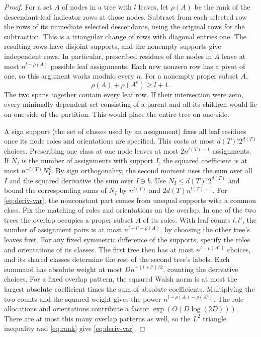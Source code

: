 \documentclass[11pt,letterpaper]{article}
\begin{document}
\begin{proof}
For a set \(A\) of nodes in a tree with \(l\) leaves, let \(\rho(A)\)
be the rank of the descendant-leaf indicator rows at those nodes.
Subtract from each selected row the rows of its immediate selected
descendants, using the original rows for the subtraction. This is
a triangular change of rows with diagonal entries one. The resulting
rows have disjoint supports, and the nonempty supports give
independent rows. In particular, prescribed
residues of the nodes in \(A\) leave at most \(n^{l-\rho(A)}\) possible
leaf assignments. Each new nonzero row has a pivot of one, so this
argument works modulo every \(n\). For a nonempty proper subset \(A\),
\begin{equation}\label{eq:rank}
 \rho(A)+\rho(A^{\mathrm c})\ge l+1.
\end{equation}
The two spans together contain every leaf row. If their intersection
were zero, every minimally dependent set consisting of a parent and
all its children would lie on one side of the partition. This would
place the entire tree on one side.

A sign support (the set of classes used by an assignment) fixes all
leaf residues once its node roles and orientations are specified.
This costs at most \(d(T)!2^{d(T)}\) choices. Prescribing one class at
one node leaves at most \(2n^{l(T)-1}\) assignments. If \(N_I\) is the
number of assignments with support \(I\), the squared coefficient is
at most \(n^{-l(T)}N_I^2\). By sign orthogonality, the second moment
uses the sum over all \(I\) and the squared derivative the sum over
\(I\ni b\). Use \(N_I\le d(T)!2^{d(T)}\) and bound the corresponding
sums of \(N_I\) by \(n^{l(T)}\) and \(2d(T)n^{l(T)-1}\).
For \eqref{eq:deriv-var}, the nonconstant part comes from unequal
supports with a common class. Fix the matching of roles and
orientations on the overlap. In one of the two trees the overlap
occupies a proper subset \(A\) of its roles. With leaf counts \(l,l'\),
the number of assignment pairs is at most \(n^{l+l'-\rho(A)}\), by
choosing the other tree's leaves first. For any fixed symmetric
difference of the supports, specify the roles and orientations of
its classes. The first tree then has at most \(n^{l-\rho(A^{\mathrm c})}\)
choices, and its shared classes determine the rest of the second
tree's labels. Each summand has absolute weight at most
\(D n^{-(l+l')/2}\), counting the derivative choices. For a fixed
overlap pattern, the squared Walsh norm is at most the largest
absolute coefficient times the sum of absolute coefficients.
Multiplying the two counts and the squared weight gives the power
\(n^{l-\rho(A)-\rho(A^{\mathrm c})}\). The role allocations and
orientations contribute a factor \(\exp(O(D\log(2D)))\). There are at most
this many overlap patterns as well, so the \(L^2\) triangle
inequality and \eqref{eq:rank} give \eqref{eq:deriv-var}.


\end{proof}
\end{document}
